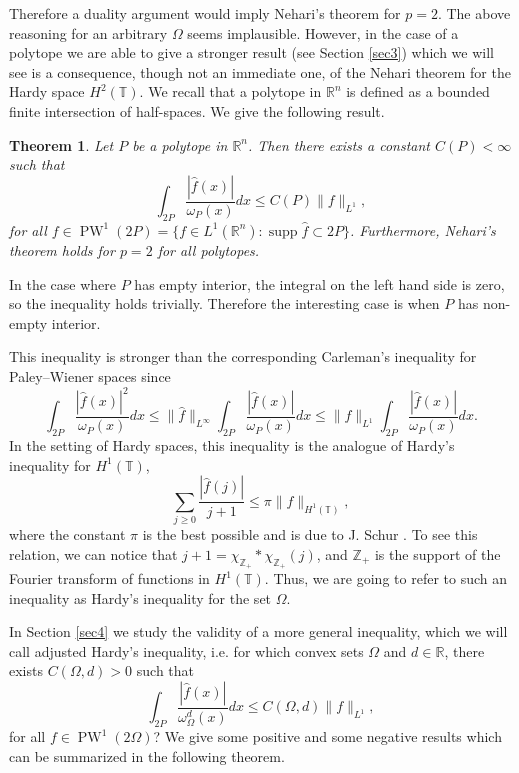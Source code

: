 \documentclass[footinclude=true]{amsart}
\theoremstyle{plain}
\newtheorem{theo}{Theorem}[section]
\DeclareMathOperator{\PW}{PW}
\DeclareMathOperator{\supp}{supp}
\begin{document}
	Therefore a duality argument would imply Nehari's theorem for $p=2$. The above reasoning for an arbitrary $\Omega$ seems implausible. However, in the case of a polytope we are able to give a stronger result (see Section \ref{sec3}) which we will see is a consequence, though not an immediate one, of the Nehari theorem for the Hardy space $H^2(\mathbb{T})$. We recall that a polytope in $\mathbb{R}^{n}$ is defined as a bounded finite intersection of half-spaces.
	We give the following result.
	\begin{theo}\label{poly}
		Let $P$ be a polytope in $\mathbb{R}^{n}$. Then there exists a constant $C(P)<\infty$ such that 
		$$\int_{2P}\dfrac{|\widehat{f}(x)|}{\omega_{P}(x)}dx\leq C(P)\|f\|_{L^{1}},$$ for all $f\in \PW^{1}(2P)=\{f\in L^{1}(\mathbb{R}^{n}):\supp\widehat{f}\subset 2P\}$. Furthermore, Nehari's theorem holds for $p=2$ for all polytopes.
	\end{theo}
    In the case where $P$ has empty interior, the integral on the left hand side is zero, so the inequality holds trivially. Therefore the interesting case is when $P$ has non-empty interior. 
    \par This inequality is stronger than the corresponding Carleman's inequality for Paley--Wiener spaces since 
    $$\int_{2P}\dfrac{|\widehat{f}(x)|^{2}}{\omega_{P}(x)}dx\leq \|\widehat{f}\|_{L^{\infty}}\int_{2P}\dfrac{|\widehat{f}(x)|}{\omega_{P}(x)}dx\leq \|f\|_{L^{1}}\int_{2P}\dfrac{|\widehat{f}(x)|}{\omega_{P}(x)}dx.$$
	In the setting of Hardy spaces, this inequality is the analogue of Hardy's inequality for $H^{1}(\mathbb{T})$, 
	$$\sum_{j\geq 0}\frac{|\widehat{f}(j)|}{j+1}\leq \pi \|f\|_{H^{1}(\mathbb{T})},$$ where the constant $\pi$ is the best possible and is due to J. Schur \cite{MR1580823}. To see this relation, we can notice that $j+1=\chi_{\mathbb{Z}_{+}}\ast \chi_{\mathbb{Z}_{+}}(j)$, and $\mathbb{Z}_{+}$ is the support of the Fourier transform of functions in $H^1(\mathbb{T})$. Thus, we are going to refer to such an inequality as Hardy's inequality for the set $\Omega$.
	\par In Section \ref{sec4} we study the validity of a more general inequality, which we will call adjusted Hardy's inequality, i.e. for which convex sets $\Omega$ and $d\in\mathbb{R}$, there exists $C(\Omega,d)>0$ such that 
	$$\int_{2P}\dfrac{|\widehat{f}(x)|}{\omega^{d}_{\Omega}(x)}dx\leq C(\Omega,d)\|f\|_{L^{1}},$$ for all $f\in \PW^1(2\Omega)$? We give some positive and some negative results which can be summarized in the following theorem.
\end{document}
